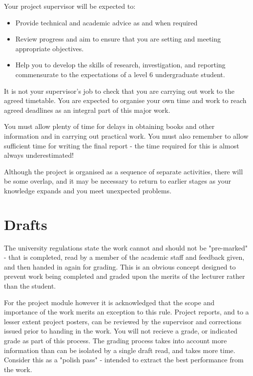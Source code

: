 Your project supervisor will be expected to: 

\begin{itemize}
    \item Provide technical and academic advice as and when required
    \item Review progress and aim to ensure that you are setting and meeting appropriate objectives.
    \item Help you to develop the skills of research, investigation, and reporting commensurate to the expectations of a level 6 undergraduate student.
\end{itemize}

\begin{tcolorbox}
    It is not your supervisor’s job to check that you are carrying out work to the
    agreed timetable. You are expected to organise your own time and work to
    reach agreed deadlines as an integral part of this major work.
\end{tcolorbox}

You must allow plenty of time for delays in obtaining books and other information and in carrying out practical work. You must also remember to allow sufficient time for writing the final report - the time required for this is almost always underestimated!

Although the project is organised as a sequence of separate activities, there will be some overlap, and it may be necessary to return to earlier stages as your knowledge expands and you meet unexpected problems.

\section{Drafts}

The university regulations state the work cannot and should not be "pre-marked" - that is completed, read by a member of the academic staff and feedback given, and then handed in again for grading. This is an obvious concept designed to prevent work being completed and graded upon the merits of the lecturer rather than the student. 

For the project module however it is acknowledged that the scope and importance of the work merits an exception to this rule. Project reports, and to a lesser extent project posters, can be reviewed by the supervisor and corrections issued prior to handing in the work. You will not recieve a grade, or indicated grade as part of this process. The grading process takes into account more information than can be isolated by a single draft read, and takes more time. Consider this as a "polish pass" - intended to extract the best performance from the work.

